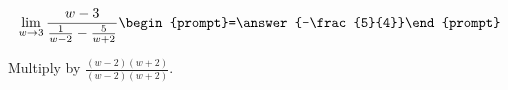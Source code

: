 \documentclass{ximera}
\author{Bart Snapp}
\begin{document}
\begin{exercise}

\[
\lim_{w\to 3 } \frac{w-3}{\frac{1}{w-2}-\frac{5}{w+2}}  \begin{prompt}=\answer{-\frac{5}{4}}\end{prompt}
\]
\begin{hint}
Multiply by $\frac{(w-2) (w+2)}{(w-2) (w+2)}$.
\end{hint}
\end{exercise}
\end{document}
